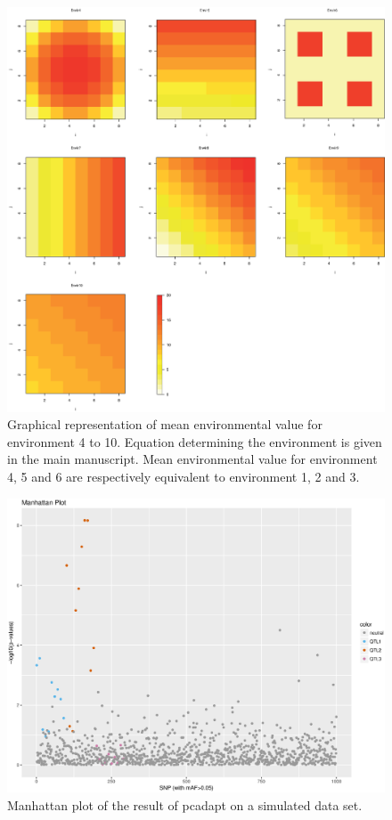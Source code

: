 \documentclass[a4paper,times,10pt,authoryear]{article}%
\begin{document}
\begin{figure}[t]
\begin{center}
\includegraphics[height=0.8\textheight]{figures/environmentaldata.eps}
\end{center}
\caption{Graphical representation of mean environmental value for environment 4 to 10. Equation determining the environment is given in the main manuscript. Mean environmental value for environment 4, 5 and 6 are respectively equivalent to environment 1, 2 and 3.}%
\label{fig:environmentaldata}%
\end{figure}


\begin{figure}[t]
\begin{center}
\includegraphics[height=0.4\textheight]{figures/sim105_pcadapt.eps}
\end{center}
\caption{Manhattan plot of the result of pcadapt on a simulated data set.}%
\label{fig:pcadapt}%
\end{figure}
\end{document}
